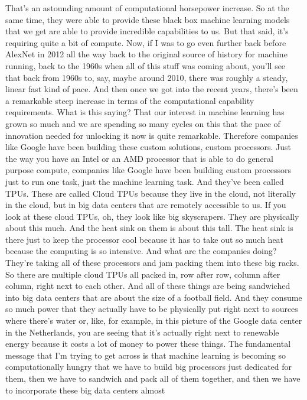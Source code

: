 That's an astounding amount of computational horsepower increase.
So at the same time, they were able to provide these black box machine learning models that we get are able to provide incredible capabilities to us.
But that said, it's requiring quite a bit of compute.
Now, if I was to go even further back before AlexNet in 2012 all the way back to the original source of history for machine running, back to the 1960s when all of this stuff was coming about, you'll see that back from 1960s to, say, maybe around 2010, there was roughly a steady, linear fast kind of pace.
And then once we got into the recent years, there's been a remarkable steep increase in terms of the computational capability requirements.
What is this saying?
That our interest in machine learning has grown so much and we are spending so many cycles on this that the pace of innovation needed for unlocking it now is quite remarkable.
Therefore companies like Google have been building these custom solutions, custom processors.
Just the way you have an Intel or an AMD processor that is able to do general purpose compute, companies like Google have been building custom processors just to run one task, just the machine learning task.
And they've been called TPUs.
These are called Cloud TPUs because they live in the cloud, not literally in the cloud, but in big data centers that
are remotely accessible to us.
If you look at these cloud TPUs, oh, they look like big skyscrapers.
They are physically about this much.
And the heat sink on them is about this tall.
The heat sink is there just to keep the processor cool
because it has to take out so much heat because the computing is so intensive.
And what are the companies doing?
They're taking all of these processors and jam packing them
into these big racks.
So there are multiple cloud TPUs all packed in, row after row,
column after column, right next to each other.
And all of these things are being sandwiched into big data centers that
are about the size of a football field.
And they consume so much power that they actually
have to be physically put right next to sources where there's water
or, like, for example, in this picture of the Google data
center in the Netherlands, you are seeing that it's actually
right next to renewable energy because it costs a lot of money
to power these things.
The fundamental message that I'm trying to get across
is that machine learning is becoming so computationally
hungry that we have to build big processors just dedicated for them,
then we have to sandwich and pack all of them together,
and then we have to incorporate these big data centers almost
